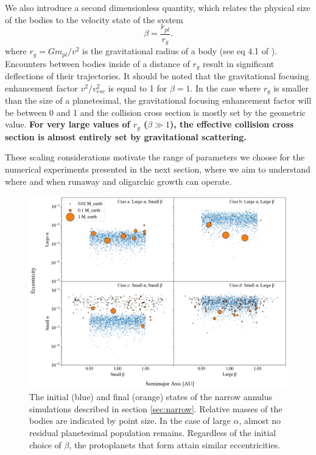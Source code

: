 \documentclass[twocolumn,linenumbers]{aastex63}
\begin{document}
We also introduce a second dimensionless quantity, which relates the physical size of the bodies to the velocity state of the system
\begin{equation}\label{eq:beta}
	\beta = \frac{r_{pl}}{r_{g}}.
\end{equation}
where $r_{g} = G m_{pl} / v^{2}$ is the gravitational radius of a body (see eq 4.1 of \citet{ida90}). Encounters between bodies inside of a distance of $r_{g}$ result in significant deflections of their trajectories. It should be noted that the gravitational focusing enhancement factor $v^{2}/v_{esc}^{2}$ is equal to 1 for $\beta = 1$. In the case where $r_{g}$ is smaller than the size of a planetesimal, the gravitational focusing enhancement factor will be between 0 and 1 and the collision cross section is mostly set by the geometric value. \textbf{For very large values of $r_{g}$ ($\beta \gg 1$), the effective collision cross section is almost entirely set by gravitational scattering.}

These scaling considerations motivate the range of parameters we choose for the numerical experiments presented in the next section, where we aim to understand where and when runaway and oligarchic growth can operate.

\begin{figure}
\begin{center}
    \includegraphics[width=\textwidth]{figures/alpha_beta.png}
    \caption{The initial (blue) and final (orange) states of the narrow annulus simulations described in section \ref{sec:narrow}. 
    Relative masses of the bodies are indicated by point size. In the case of large $\alpha$, almost no residual planetesimal 
    population remains. Regardless of the initial choice of $\beta$, the protoplanets that form attain similar eccentricities. 
    \label{fig:alpha_beta}}
\end{center}
\end{figure}
\end{document}
